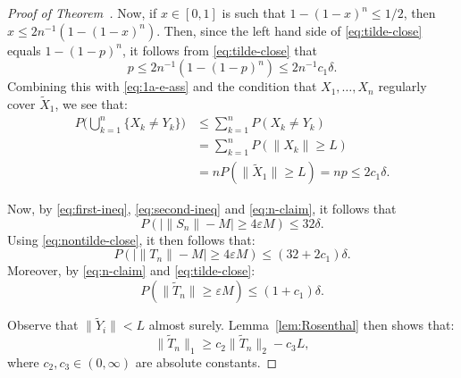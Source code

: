 \documentclass[12pt]{amsart}
\def\e{\varepsilon}
\def\oo{\infty}
\def\upref#1{\upn{\ref{#1}}}
\theoremstyle{definition}
\theoremstyle{plain}
\theoremstyle{remark}
\begin{document}
\begin{proof}[Proof of Theorem~\upref{th:main}]
Now, if $x\in[0,1]$ is such that $1-(1-x)^n\le 1/2$, then $x\le
2n^{-1} (1-(1-x)^n)$.
Then, since the left hand side of \eqref{eq:tilde-close} equals
$1-(1-p)^n$, it follows from \eqref{eq:tilde-close} that
$$
        p\le 2n^{-1} (1-(1-p)^n) \le 2n^{-1} c_1\delta.
$$
Combining this with \eqref{eq:1a-e-ass}
and the condition that $X_1,\dots,X_n$ regularly cover $\tilde X_1$, we
see that:
\begin{equation}\label{eq:nontilde-close}
\begin{split}
        P\biggl(\bigcup_{k=1}^n \{ X_k\ne Y_k \}\biggr)
         &\le \sum_{k=1}^n P(X_k\ne Y_k) \\
         &=\sum_{k=1}^n P(\|X_k\|\ge L) \\
         &=n P(\|\tilde X_1\|\ge L)=np\le 2c_1\delta.
\end{split}
\end{equation}

Now, by \eqref{eq:first-ineq}, \eqref{eq:second-ineq} and
\eqref{eq:n-claim}, it follows that
$$
        P(|\|S_n\|-M|\ge 4\e M) \le 32\delta.
$$
Using \eqref{eq:nontilde-close}, it then follows that:
\begin{equation}\label{eq:n-claim-2-adj}
        P(|\|T_n\|-M|\ge 4\e M) \le (32+2c_1)\delta.
\end{equation}
Moreover, by \eqref{eq:n-claim} and \eqref{eq:tilde-close}:
\begin{equation}\label{eq:n-claim-s}
        P(\|\tilde T_n\|\ge \e M)\le (1+c_1)\delta.
\end{equation}

Observe that $\|\tilde Y_i\|<L$ almost surely.
Lemma~\ref{lem:Rosenthal} then shows that:
\begin{equation}\label{eq:Rosenthal}
        \|\tilde T_n\|_1 \ge c_2 \|\tilde T_n\|_2 - c_3 L ,
\end{equation}
where $c_2,c_3\in (0,\oo)$ are absolute constants.


\end{proof}
\end{document}
